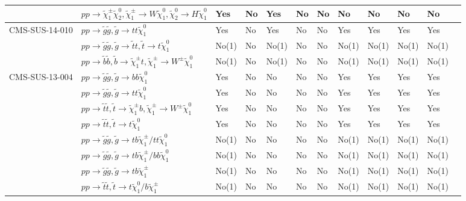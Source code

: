 \documentclass[11pt,A4paper]{article}
\begin{document}
\begin{landscape}
\begin{longtable} {|l|l|l|l|l|l|l|l|l|l|l|l|}
  & $pp \rightarrow \tilde{\chi}_1 ^{\pm} \tilde{\chi}_2 ^0 , \tilde{\chi}_1 ^{\pm} \rightarrow W \tilde{\chi}_1 ^0 , \tilde{\chi}_2 ^0 \rightarrow H \tilde{\chi}_1 ^0$ & Yes & No & Yes & No & No & No & No & No & No & \\ \hline
CMS-SUS-14-010 & $pp \rightarrow \tilde{g} \tilde{g}, \tilde{g}\rightarrow t  t  \tilde{\chi}_1 ^0 $ & Yes & No & Yes & No & No & Yes & Yes & Yes & Yes & \\
 & $pp \rightarrow \tilde{g} \tilde{g}, \tilde{g}\rightarrow \tilde{t} t,\tilde{t}\rightarrow t \tilde{\chi}_1 ^0$ & No(1) & No & No(1) & No & No & No(1) & No(1) & No(1) & No(1) & \\
  & $pp \rightarrow \tilde{b} \tilde{b}, \tilde{b}\rightarrow \tilde{\chi}_1 ^{\pm} t,\tilde{\chi}_1 ^{\pm} \rightarrow W^{\pm} \tilde{\chi}_1 ^0$ & No(1) & No & No(1) & No & No & No(1) & No(1) & No(1) & No(1) & \\ \hline
CMS-SUS-13-004 & $pp \rightarrow \tilde{g} \tilde{g}, \tilde{g} \rightarrow b  b \tilde{\chi}_1 ^0 $ & Yes & No & No & No & No & Yes & Yes & Yes & Yes & \\
  & $pp \rightarrow \tilde{g} \tilde{g}, \tilde{g}\rightarrow t  t  \tilde{\chi}_1 ^0 $ & Yes & No & No & No & No & Yes & Yes & Yes & Yes & \\
  & $pp \rightarrow \tilde{t} \tilde{t}, \tilde{t}\rightarrow \tilde{\chi}_1 ^{\pm} b,\tilde{\chi}_1 ^{\pm} \rightarrow W^{\pm} \tilde{\chi}_1 ^0$ & Yes & No & No & No & No & Yes & Yes & Yes & Yes & \\
  & $pp \rightarrow \tilde{t} \tilde{t}, \tilde{t}\rightarrow t  \tilde{\chi}_1 ^0 $ & Yes & No & No & No & No & Yes & Yes & Yes & Yes & \\
  & $pp \rightarrow \tilde{g} \tilde{g}, \tilde{g} \rightarrow t b \tilde{\chi}_1 ^{\pm} / t t \tilde{\chi}_1 ^0 $ & No(1) & No & No & No & No & No(1) & No(1) & No(1) & No(1) & \\
  & $pp \rightarrow \tilde{g} \tilde{g}, \tilde{g} \rightarrow t b \tilde{\chi}_1 ^{\pm} / b b \tilde{\chi}_1 ^0 $ & No(1) & No & No & No & No & No(1) & No(1) & No(1) & No(1) & \\
  & $pp \rightarrow \tilde{g} \tilde{g}, \tilde{g} \rightarrow t b \tilde{\chi}_1 ^{\pm} $ & No(1) & No & No & No & No & No(1) & No(1) & No(1) & No(1) & \\
  & $pp \rightarrow \tilde{t} \tilde{t}, \tilde{t} \rightarrow t \tilde{\chi}_1 ^0 / b \tilde{\chi}_1 ^{\pm} $ & No(1) & No & No & No & No & No(1) & No(1) & No(1) & No(1) & \\ \hline

\end{longtable}
\end{landscape}
\end{document}
